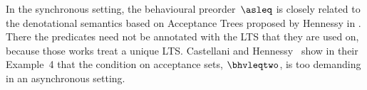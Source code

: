 In the synchronous setting, the behavioural preorder~$\asleq$ is closely related to the denotational semantics
based on Acceptance Trees  proposed by Hennessy in
\cite{DBLP:journals/jacm/Hennessy85,DBLP:books/daglib/0066919}.
There the predicates need not be annotated with the LTS that they are used on,
because those works treat a unique LTS.
Castellani and Hennessy~\cite{DBLP:conf/fsttcs/CastellaniH98} show in their Example~4 that
the condition on acceptance sets, \ie $\bhvleqtwo$, is too demanding
in an asynchronous setting.


